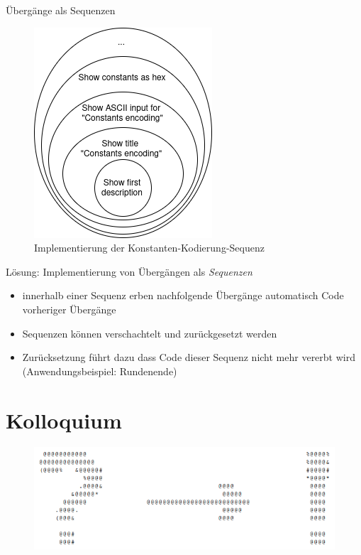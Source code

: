 \documentclass{beamer}
\begin{document}
\begin{frame}{Übergänge als Sequenzen}
\begin{figure}
\center
\begin{minipage}{.3\textwidth}
\includegraphics[width=\textwidth]{figures/onion.png}
\end{minipage}
\caption{Implementierung der Konstanten-Kodierung-Sequenz}
\end{figure}
Lösung: Implementierung von Übergängen als \textit{Sequenzen}
\begin{itemize}
\item innerhalb einer Sequenz erben nachfolgende Übergänge automatisch Code vorheriger Übergänge
\item Sequenzen können verschachtelt und zurückgesetzt werden
\item Zurücksetzung führt dazu dass Code dieser Sequenz nicht mehr vererbt wird (Anwendungsbeispiel: Rundenende)
\end{itemize}
\end{frame}

\section{Kolloquium}
\begin{frame}
\begin{figure}
\center
\begin{minipage}{0.8\textwidth}
\includegraphics[width=\textwidth]{figures/kolloquium/kolloquium-ascii-art.png}
\end{minipage}
\end{figure}
\end{frame}
\end{document}
